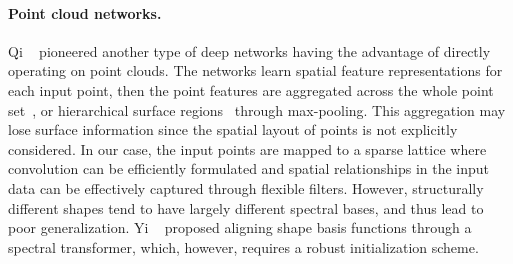 \documentclass[10pt,twocolumn,letterpaper]{article}
\newcommand{\camreadycomment}[1]{{\textcolor{red}{#1}}}
\begin{document}
\vspace{-0.35cm}\paragraph{Point cloud networks.} Qi \etal~\cite{qi2017pointnet} pioneered another type of deep networks having the advantage of directly operating on point clouds. The networks learn spatial feature representations for each input point, then the point features are aggregated across the whole point set~\cite{qi2017pointnet}, or hierarchical surface regions~\cite{qi2017pointnetpp} through max-pooling. This aggregation may lose surface information since the spatial layout of points is not explicitly considered. In our case, the input points are mapped to a sparse lattice where convolution can be efficiently formulated and spatial relationships in the input data can be effectively captured through flexible filters. 
However, structurally different shapes tend to have largely different spectral bases, and thus lead to poor generalization. 
Yi \etal~\cite{yi2017syncspeccnn} proposed aligning shape basis functions through a spectral transformer, which, however, requires a robust initialization scheme.
\end{document}
